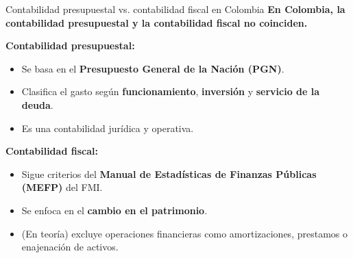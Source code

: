 \begin{frame}{Contabilidad presupuestal vs. contabilidad fiscal en Colombia}
\textbf{En Colombia, la contabilidad presupuestal y la contabilidad fiscal no coinciden.}

\vspace{1em}
\textbf{Contabilidad presupuestal:}
\begin{itemize}
  \item Se basa en el \textbf{Presupuesto General de la Nación (PGN)}.
  \item Clasifica el gasto según \textbf{funcionamiento}, \textbf{inversión} y \textbf{servicio de la deuda}.
  \item Es una contabilidad jurídica y operativa.
\end{itemize}

\vspace{1em}
\textbf{Contabilidad fiscal:}
\begin{itemize}
  \item Sigue criterios del \textbf{Manual de Estadísticas de Finanzas Públicas (MEFP)} del FMI.
  \item Se enfoca en el  \textbf{cambio en el patrimonio}.
  \item (En teoría) excluye operaciones financieras como amortizaciones, prestamos o enajenación de activos.
\end{itemize}

\end{frame}



